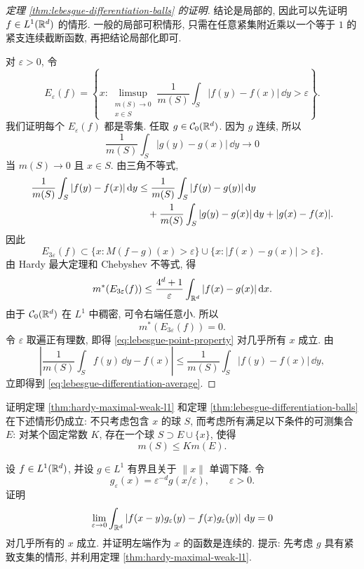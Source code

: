 \begin{proof}[定理 \ref{thm:lebesgue-differentiation-balls} 的证明]
	结论是局部的, 因此可以先证明 \(f\in L^1(\mathbb{R}^d)\) 的情形. 一般的局部可积情形, 只需在任意紧集附近乘以一个等于 \(1\) 的紧支连续截断函数, 再把结论局部化即可.
	
	对 \(\varepsilon>0\), 令
	\[
	E_\varepsilon(f)=\left\{x:
	\limsup_{\substack{m(S)\to0\\x\in S}}
	\frac{1}{m(S)}\int_S |f(y)-f(x)|\,\dd y>\varepsilon
	\right\}.
	\]
	我们证明每个 \(E_\varepsilon(f)\) 都是零集. 任取 \(g\in\mathcal{C}_0(\mathbb{R}^d)\). 因为 \(g\) 连续, 所以
	\[
	\frac{1}{m(S)}\int_S |g(y)-g(x)|\,\dd y\longrightarrow0
	\]
	当 \(m(S)\to0\) 且 \(x\in S\). 由三角不等式,
	\begin{align*}
		\frac{1}{m(S)}\int_S |f(y)-f(x)|\,\dd y
		&\leq
		\frac{1}{m(S)}\int_S |f(y)-g(y)|\,\dd y\nobreak\\
		&\quad+
		\frac{1}{m(S)}\int_S |g(y)-g(x)|\,\dd y
		+|g(x)-f(x)|.
	\end{align*}
	因此
	\[
	E_{3\varepsilon}(f)
	\subset
	\{x:M(f-g)(x)>\varepsilon\}
	\cup
	\{x:|f(x)-g(x)|>\varepsilon\}.
	\]
	由 Hardy 最大定理和 Chebyshev 不等式, 得
	\[
	m^*(E_{3\varepsilon}(f))
	\leq
	\frac{4^d+1}{\varepsilon}
	\int_{\mathbb{R}^d}|f(x)-g(x)|\,\dd x.
	\]
	由于 \(\mathcal{C}_0(\mathbb{R}^d)\) 在 \(L^1\) 中稠密, 可令右端任意小. 所以
	\[
	m^*(E_{3\varepsilon}(f))=0.
	\]
	令 \(\varepsilon\) 取遍正有理数, 即得 \eqref{eq:lebesgue-point-property} 对几乎所有 \(x\) 成立. 由
	\[
	\left|\frac{1}{m(S)}\int_S f(y)\,\dd y-f(x)\right|
	\leq
	\frac{1}{m(S)}\int_S |f(y)-f(x)|\,\dd y,
	\]
	立即得到 \eqref{eq:lebesgue-differentiation-average}.
\end{proof}

\begin{exer}\label{exer:differentiation-general-bases}
	证明定理 \ref{thm:hardy-maximal-weak-l1} 和定理 \ref{thm:lebesgue-differentiation-balls} 在下述情形仍成立: 不只考虑包含 \(x\) 的球 \(S\), 而考虑所有满足以下条件的可测集合 \(E\): 对某个固定常数 \(K\), 存在一个球 \(S\supset E\cup\{x\}\), 使得
	\[
	m(S)\leq K m(E).
	\]
\end{exer}

\begin{exer}\label{exer:approximate-identity-l1}
	设 \(f\in L^1(\mathbb{R}^d)\), 并设 \(g\in L^1\) 有界且关于 \(\|x\|\) 单调下降. 令
	\[
	g_\varepsilon(x)=\varepsilon^{-d}g(x/\varepsilon),
	\qquad \varepsilon>0.
	\]
	证明
	\[
	\lim_{\varepsilon\to0}
	\int_{\mathbb{R}^d}\left|f(x-y)g_\varepsilon(y)-f(x)g_\varepsilon(y)\right|\,\dd y=0
	\]
	对几乎所有的 \(x\) 成立. 并证明左端作为 \(x\) 的函数是连续的. 提示: 先考虑 \(g\) 具有紧致支集的情形, 并利用定理 \ref{thm:hardy-maximal-weak-l1}.
\end{exer}

